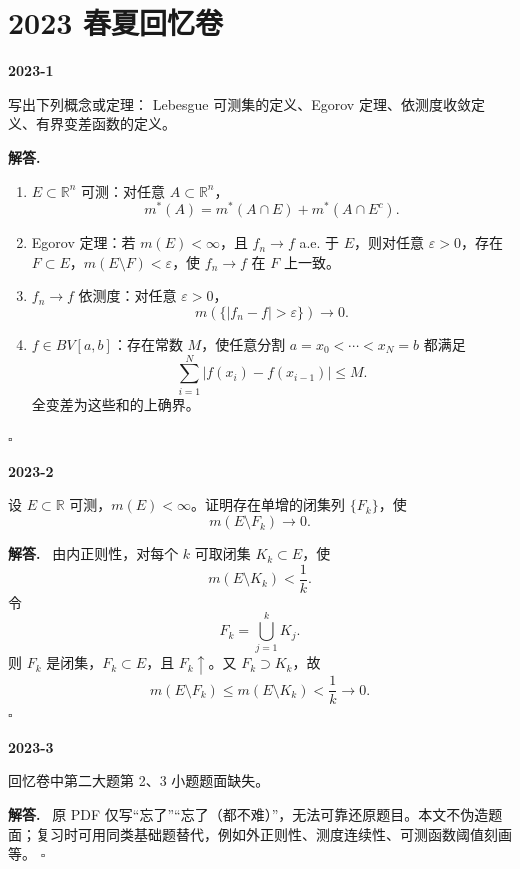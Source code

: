\documentclass[UTF8]{ctexart}
\newcommand{\R}{\mathbb R}
\newcommand{\eps}{\varepsilon}
\newenvironment{problem}[1]{\par\medskip\noindent\textbf{#1}\par\smallskip}{\par}
\newenvironment{solution}{\par\noindent\textbf{解答.}\ }{\hfill$\square$\par\medskip}
\begin{document}
\section{2023 春夏回忆卷}

\begin{problem}{2023-1}
写出下列概念或定理：
Lebesgue 可测集的定义、Egorov 定理、依测度收敛定义、有界变差函数的定义。
\end{problem}
\begin{solution}
\begin{enumerate}[label=(\arabic*)]
  \item \(E\subset\R^n\) 可测：对任意 \(A\subset\R^n\)，
  \[
    m^*(A)=m^*(A\cap E)+m^*(A\cap E^c).
  \]
  \item Egorov 定理：若 \(m(E)<\infty\)，且 \(f_n\to f\) a.e. 于 \(E\)，则对任意
  \(\eps>0\)，存在 \(F\subset E\)，\(m(E\setminus F)<\eps\)，使 \(f_n\to f\) 在 \(F\) 上一致。
  \item \(f_n\to f\) 依测度：对任意 \(\eps>0\)，
  \[
    m(\{|f_n-f|>\eps\})\to0.
  \]
  \item \(f\in BV[a,b]\)：存在常数 \(M\)，使任意分割
  \(a=x_0<\cdots<x_N=b\) 都满足
  \[
    \sum_{i=1}^N |f(x_i)-f(x_{i-1})|\le M.
  \]
  全变差为这些和的上确界。
\end{enumerate}
\end{solution}

\begin{problem}{2023-2}
设 \(E\subset\R\) 可测，\(m(E)<\infty\)。证明存在单增的闭集列 \(\{F_k\}\)，使
\[
  m(E\setminus F_k)\to0.
\]
\end{problem}
\begin{solution}
由内正则性，对每个 \(k\) 可取闭集 \(K_k\subset E\)，使
\[
  m(E\setminus K_k)<\frac1k.
\]
令
\[
  F_k=\bigcup_{j=1}^k K_j.
\]
则 \(F_k\) 是闭集，\(F_k\subset E\)，且 \(F_k\uparrow\)。又 \(F_k\supset K_k\)，故
\[
  m(E\setminus F_k)\le m(E\setminus K_k)<\frac1k\to0.
\]
\end{solution}

\begin{problem}{2023-3}
回忆卷中第二大题第 2、3 小题题面缺失。
\end{problem}
\begin{solution}
原 PDF 仅写“忘了”“忘了（都不难）”，无法可靠还原题目。本文不伪造题面；复习时可用同类基础题替代，例如外正则性、测度连续性、可测函数阈值刻画等。
\end{solution}
\end{document}
